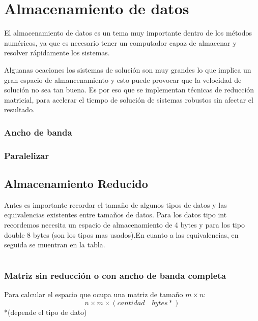 \chapter{Almacenamiento de datos }
El almacenamiento de datos es un tema muy importante dentro de los m\'etodos num\'ericos, ya que es necesario tener un computador capaz de almacenar y resolver r\'apidamente los sistemas.

Alguanas ocaciones los sistemas de soluci\'on son muy grandes lo que implica un gran espacio de almancenamiento y esto puede provocar que la velocidad de soluci\'on no sea tan buena. Es por eso que se implementan t\'ecnicas de reducci\'on matricial, para acelerar el tiempo de soluci\'on de sistemas robustos sin afectar el resultado.
\subsection{Ancho de banda}

\subsection{Paralelizar}

\section{Almacenamiento Reducido}
Antes es importante recordar el tamaño de algunos tipos de datos y las equivalencias existentes entre tamaños de datos. Para los datos tipo int recordemos necesita un espacio de almacenamiento de 4 bytes y para los tipo double 8 bytes (son los tipos mas usados).En cuanto a las equivalencias, en seguida se muentran en la tabla.
\begin{tabular}{| c | c |}
\end{tabular}
\subsection{Matriz sin reducci\'on o con ancho de banda completa}
Para calcular el espacio que ocupa una matriz de tamaño $m \times n$:
\begin{displaymath}
n\times m\times (cantidad\quad bytes*)
\end{displaymath}
*(depende el tipo de dato) 


 